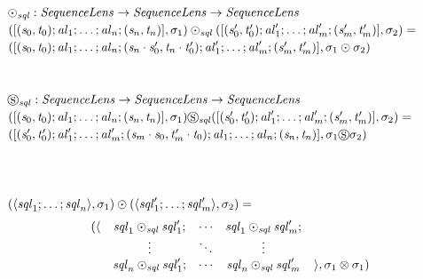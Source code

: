 \documentclass[numbers]{sigplanconf}
\begin{document}
\begin{definition}\leavevmode\\
  $\odot_{\mathit{sql}}{} :{}
  \mathit{SequenceLens}{} \rightarrow \mathit{SequenceLens}{} \rightarrow \mathit{SequenceLens}{}$\\
  $([(\mathit{s}_0,\mathit{t}_0);\mathit{al}_1;\ldots;\mathit{al}_n;(\mathit{s}_n,\mathit{t}_n)],\sigma_1)\odot_{\mathit{sql}}([(\mathit{s}_0',\mathit{t}_0');\mathit{al}_1';\ldots;\mathit{al}_m';(\mathit{s}_m',\mathit{t}_m')],\sigma_2)=$\\
\hspace*{2ex}$([(\mathit{s}_0,\mathit{t}_0);\mathit{al}_1;\ldots;\mathit{al}_n;
  (\mathit{s}_n\cdot\mathit{s}_0',\mathit{t}_n\cdot\mathit{t}_0');\mathit{al}_1';
  \ldots;\mathit{al}_m';(\mathit{s}_m',\mathit{t}_m')],\sigma_1\odot\sigma_2)$\\
\\
\\$\circledS_{\mathit{sql}}{} :{}
  \mathit{SequenceLens}{} \rightarrow \mathit{SequenceLens}{} \rightarrow \mathit{SequenceLens}{}$\\
  $([(\mathit{s}_0,\mathit{t}_0);\mathit{al}_1;\ldots;\mathit{al}_n;(\mathit{s}_n,\mathit{t}_n)],\sigma_1)\circledS_{\mathit{sql}}([(\mathit{s}_0',\mathit{t}_0');\mathit{al}_1';\ldots;\mathit{al}_m';(\mathit{s}_m',\mathit{t}_m')],\sigma_2)=$\\
\hspace*{2ex}$([(\mathit{s}_0',\mathit{t}_0');\mathit{al}_1';\ldots;\mathit{al}_m';
  (\mathit{s}_m\cdot\mathit{s}_0,\mathit{t}_m'\cdot\mathit{t}_0);\mathit{al}_1;
  \ldots;\mathit{al}_n;(\mathit{s}_n,\mathit{t}_n)],\sigma_1\circledS\sigma_2)$\\
\\
\\\ConcatDNFLens{} \OfType{}
\ArrowTypeOf{\DNFLensType{}}{\ArrowTypeOf{\DNFLensType{}}{\DNFLensType{}}}\\
$(\langle\mathit{sql}_1;\ldots;\mathit{sql}_n\rangle,\sigma_1)\odot(\langle\mathit{sql}_1';\ldots;\mathit{sql}_m'\rangle,\sigma_2)=$
\[
\begin{array}{rcccl}
(\langle & \mathit{sql}_1\odot_{\mathit{sql}}\mathit{sql}_1'; & \cdots & \mathit{sql}_1\odot_{\mathit{sql}}\mathit{sql}_m'; \\
& \vdots & \ddots & \vdots \\
& \mathit{sql}_n\odot_{\mathit{sql}}\mathit{sql}_1'; & \cdots & \mathit{sql}_n\odot_{\mathit{sql}}\mathit{sql}_m' & \rangle,\sigma_1\otimes\sigma_1)

\end{array}\]
\end{definition}
\end{document}

